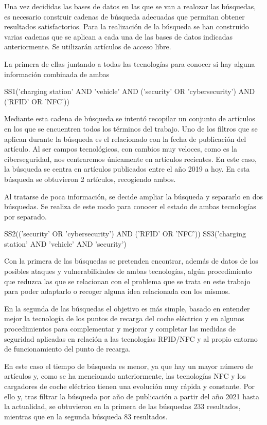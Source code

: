\documentclass[12pt,a4paper,onecolumn,oneside]{report}
\begin{document}
Una vez decididas las bases de datos en las que se van a realozar las búsquedas, es necesario construir cadenas de búsqueda adecuadas que permitan obtener resultados satisfactorios. Para la realización de la búsqueda se han construido varias cadenas que se aplican a cada una de las bases de datos indicadas anteriormente. Se utilizarán artículos de acceso libre.

La primera de ellas juntando a todas las tecnologías para conocer si hay alguna información combinada de ambas

SS1('charging station' AND 'vehicle' AND ('security' OR 'cybersecurity') AND ('RFID' OR 'NFC'))

Mediante esta cadena de búsqueda se intentó recopilar un conjunto de artículos en los que se encuentren todos los términos del trabajo. Uno de los filtros que se aplican durante la búsqueda es el relacionado con la fecha de publicación del artículo. Al ser campos tecnológicos, con cambios muy veloces, como es la ciberseguridad, nos centraremos únicamente en artículos recientes. En este caso, la búsqueda se centra en artículos publicados entre el año 2019 a hoy. En esta búsqueda se obtuvieron 2 artículos, recogiendo ambos. 

Al tratarse de poca información, se decide ampliar la búsqueda y separarlo en dos búsquedas. Se realiza de este modo para conocer el estado de ambas tecnologías por separado. 

SS2(('security' OR 'cybersecurity') AND ('RFID' OR 'NFC'))
SS3('charging station' AND 'vehicle' AND 'security')

Con la primera de las búsquedas se pretenden encontrar, además de datos de los posibles ataques y vulnerabilidades de ambas tecnologías, algún procedimiento que reduzca las que se relacionan con el problema que se trata en este trabajo para poder adaptarlo o recoger alguna idea relacionada con los mismos.

En la segunda de las búsquedas el objetivo es más simple, basado en entender mejor la tecnología de los puntos de recarga del coche eléctrico y en algunos procedimientos para complementar y mejorar y completar las medidas de seguridad aplicadas en relación a las tecnologías RFID/NFC y al propio entorno de funcionamiento del punto de recarga.

En este caso el tiempo de búsqueda es menor, ya que hay un mayor número de artículos y, como se ha mencionado anteriormente, las tecnologías NFC y los cargadores de coche eléctrico tienen una evolución muy rápida y constante. Por ello y, tras filtrar la búsqueda por año de publicación a partir del año 2021 hasta la actualidad, se obtuvieron en la primera de las búsquedas 233 resultados, mientras que en la segunda búsqueda 83 resultados. 
\end{document}
